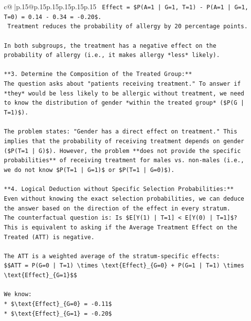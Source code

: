 \documentclass{article}
\begin{document}
{\begin{supertabular}{c@{$\;$}|p{.15\linewidth}@{}p{.15\linewidth}p{.15\linewidth}p{.15\linewidth}p{.15\linewidth}p{.15\linewidth}}
{{{\texttt{    Effect = \$P(A=1 | G=1, T=1) {-} P(A=1 | G=1, T=0) = 0.14 {-} 0.34 = {-}0.20\$.} \\
\texttt{    Treatment reduces the probability of allergy by 20 percentage points.} \\
\\ 
\texttt{In both subgroups, the treatment has a negative effect on the probability of allergy (i.e., it makes allergy *less* likely).} \\
\\ 
\texttt{**3. Determine the Composition of the Treated Group:**} \\
\texttt{The question asks about "patients receiving treatment." To answer if *they* would be less likely to be allergic without treatment, we need to know the distribution of gender *within the treated group* (\$P(G | T=1)\$).} \\
\\ 
\texttt{The problem states: "Gender has a direct effect on treatment." This implies that the probability of receiving treatment depends on gender (\$P(T=1 | G)\$). However, the problem **does not provide the specific probabilities** of receiving treatment for males vs. non{-}males (i.e., we do not know \$P(T=1 | G=1)\$ or \$P(T=1 | G=0)\$).} \\
\\ 
\texttt{**4. Logical Deduction without Specific Selection Probabilities:**} \\
\texttt{Even without knowing the exact selection probabilities, we can deduce the answer based on the direction of the effect in every stratum.} \\
\texttt{The counterfactual question is: Is \$E{[}Y(1) | T=1{]} < E{[}Y(0) | T=1{]}\$?} \\
\texttt{This is equivalent to asking if the Average Treatment Effect on the Treated (ATT) is negative.} \\
\\ 
\texttt{The ATT is a weighted average of the stratum{-}specific effects:} \\
\texttt{\$\$ATT = P(G=0 | T=1) \textbackslash{}times \textbackslash{}text\{Effect\}\_\{G=0\} + P(G=1 | T=1) \textbackslash{}times \textbackslash{}text\{Effect\}\_\{G=1\}\$\$} \\
\\ 
\texttt{We know:} \\
\texttt{*   \$\textbackslash{}text\{Effect\}\_\{G=0\} = {-}0.11\$} \\
\texttt{*   \$\textbackslash{}text\{Effect\}\_\{G=1\} = {-}0.20\$} \\
}}}
\end{supertabular}}
\end{document}
